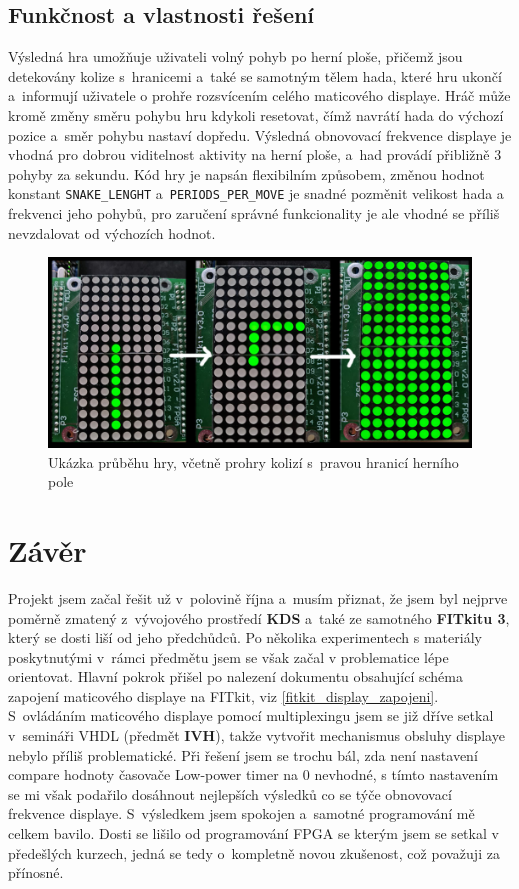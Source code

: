 \documentclass[a4paper, 11pt]{article}
\begin{document}
\subsection{Funkčnost a vlastnosti řešení}
Výsledná hra umožňuje uživateli volný pohyb po herní ploše,
přičemž jsou detekovány kolize s~hranicemi a~také se samotným tělem hada,
které hru ukončí a~informují uživatele o prohře rozsvícením celého maticového displaye.
Hráč může kromě změny směru pohybu hru kdykoli resetovat, čímž navrátí hada do výchozí pozice
a~směr pohybu nastaví dopředu. Výsledná obnovovací frekvence displaye je vhodná pro dobrou
viditelnost aktivity na herní ploše, a~had provádí přibližně 3 pohyby za sekundu.
Kód hry je napsán flexibilním způsobem, změnou hodnot konstant \verb|SNAKE_LENGHT|
a~\verb|PERIODS_PER_MOVE| je snadné pozměnit velikost hada a frekvenci jeho pohybů,
pro zaručení správné funkcionality je ale vhodné se příliš nevzdalovat od výchozích hodnot.
\begin{figure}[h!]
    \centering
    \includegraphics[width=1.0\linewidth]{prubeh.jpg}
    \caption{Ukázka průběhu hry, včetně prohry kolizí s~pravou hranicí herního pole}
\end{figure}


\section{Závěr}
Projekt jsem začal řešit už v~polovině října a~musím přiznat,
že jsem byl nejprve poměrně zmatený z~vývojového prostředí \textbf{KDS} a~také ze samotného \textbf{FITkitu 3},
který se dosti liší od jeho předchůdců. Po několika experimentech s materiály poskytnutými
v~rámci předmětu jsem se však začal v problematice lépe orientovat.
Hlavní pokrok přišel po nalezení dokumentu obsahující 
schéma zapojení maticového displaye na FITkit, viz \ref{fitkit_display_zapojeni}.
S~ovládáním maticového displaye pomocí multiplexingu jsem se již dříve setkal v~semináři VHDL (předmět \textbf{IVH}),
takže vytvořit mechanismus obsluhy displaye nebylo příliš problematické. Při řešení jsem se trochu bál,
zda není nastavení compare hodnoty časovače Low-power timer na 0 nevhodné,
s tímto nastavením se mi však podařilo dosáhnout nejlepších výsledků co se týče obnovovací frekvence displaye.
S~výsledkem jsem spokojen a~samotné programování mě celkem bavilo.
Dosti se lišilo od programování FPGA se kterým jsem se setkal v předešlých kurzech,
jedná se tedy o~kompletně novou zkušenost, což považuji za přínosné.
\end{document}
